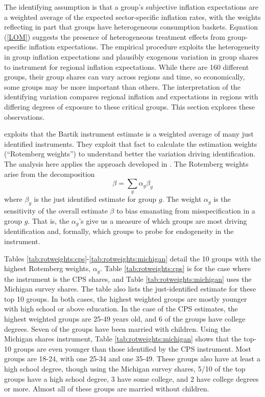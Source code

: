 \documentclass[12pt]{article}
\begin{document}
The identifying assumption is that a group's subjective inflation expectations are a weighted average of the expected sector-specific inflation rates, with the weights reflecting in part that groups have heterogeneous consumption baskets. Equation (\ref{LOM}) suggests the presence of heterogeneous treatment effects from group-specific inflation expectations. The empirical procedure exploits the heterogeneity in group inflation expectations and plausibly exogenous variation in group shares to instrument for regional inflation expectations. While there are 160 different groups, their group shares can vary across regions and time, so economically, some groups may be more important than others. The interpretation of the identifying variation compares regional inflation and expectations in regions with differing degrees of exposure to these critical groups. This section explores these observations.

\cite{Pinkhametal:AER2020} exploits that the Bartik instrument estimate is a weighted average of many just identified instruments. They exploit that fact to calculate the estimation weights (``Rotemberg weights'') to understand better the variation driving identification. The analysis here applies the approach developed in \cite{Pinkhametal:AER2020}. The Rotemberg weights arise from the decomposition
$$ \beta = \sum_g \alpha_g\beta_g$$
where $\beta_g$ is the just identified estimate for group $g$. The weight $\alpha_g$ is the sensitivity of the overall estimate $\beta$ to bias emanating from misspecification in a group $g$. That is, the $\alpha_g$'s give us a measure of which groups are most driving identification and, formally, which groups to probe for endogeneity in the instrument.  




Tables \ref{tab:rotweights:cps}-\ref{tab:rotweights:michigan} detail the 10 groups with the highest Rotemberg weights, $\alpha_g$. Table \ref{tab:rotweights:cps} is for the case where the instrument is the CPS shares, and Table \ref{tab:rotweights:michigan} uses the Michigan survey shares. The table also lists the just-identified estimate for these top 10 groups. In both cases, the highest weighted groups are mostly younger with high school or above education. In the case of the CPS estimates, the highest weighted groups are 25-49 years old, and 6 of the groups have college degrees. Seven of the groups have been married with children. Using the Michigan shares instrument, Table \ref{tab:rotweights:michigan} shows that the top-10 groups are even younger than those identified by the CPS instrument. Most groups are 18-24, with one 25-34 and one 35-49. These groups also have at least a high school degree, though using the Michigan survey shares, 5/10 of the top groups have a high school degree, 3 have some college, and 2 have college degrees or more. Almost all of these groups are married without children.
\end{document}
